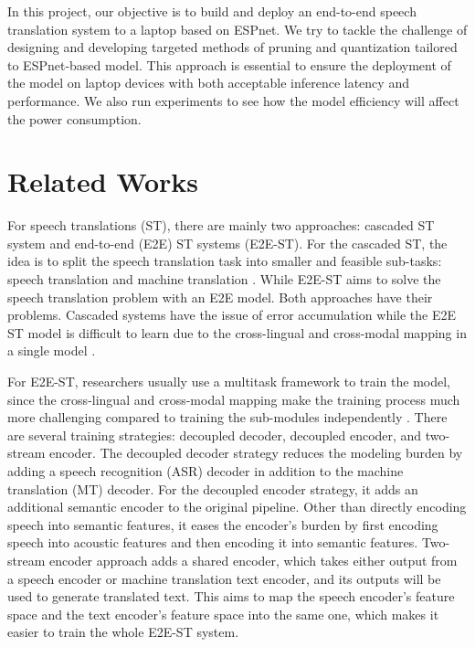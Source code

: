 \documentclass[11pt]{article}
\begin{document}
In this project, our objective is to build and deploy an end-to-end speech translation system to a laptop based on ESPnet. We try to tackle the challenge of designing and developing targeted methods of pruning and quantization tailored to ESPnet-based model. This approach is essential to ensure the deployment of the model on laptop devices with both acceptable inference latency and performance. We also run experiments to see how the model efficiency will affect the power consumption.


\section{Related Works}\label{sec:related_work}

For speech translations (ST), there are mainly two approaches: cascaded ST system and end-to-end (E2E) ST systems (E2E-ST). For the cascaded ST, the idea is to split the speech translation task into smaller and feasible sub-tasks: speech translation and machine translation \cite{xu2023recent}. While E2E-ST aims to solve the speech translation problem with an E2E model. Both approaches have their problems. Cascaded systems have the issue of error accumulation while the E2E ST model is difficult to learn due to the cross-lingual and cross-modal mapping in a single model \cite{xu2023recent}.



For E2E-ST, researchers usually use a multitask framework to train the model, since the cross-lingual and cross-modal mapping make the training process much more challenging compared to training the sub-modules independently \cite{xu2023recent}. There are several training strategies: decoupled decoder, decoupled encoder, and two-stream encoder. The decoupled decoder strategy reduces the modeling burden by adding a speech recognition (ASR) decoder in addition to the machine translation (MT) decoder. For the decoupled encoder strategy, it adds an additional semantic encoder to the original pipeline. Other than directly encoding speech into semantic features, it eases the encoder’s burden by first encoding speech into acoustic features and then encoding it into semantic features. Two-stream encoder approach adds a shared encoder, which takes either output from a speech encoder or machine translation text encoder, and its outputs will be used to generate translated text. This aims to map the speech encoder’s feature space and the text encoder’s feature space into the same one, which makes it easier to train the whole E2E-ST system. 
\end{document}
